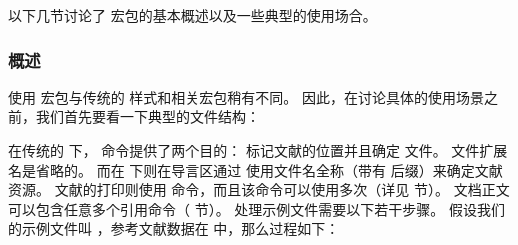 以下几节讨论了 \biblatex 宏包的基本概述以及一些典型的使用场合。

\subsubsection{概述}%
\label{use:use:int}


使用 \biblatex 宏包与传统的 \BibTeX 样式和相关宏包稍有不同。
因此，在讨论具体的使用场景之前，我们首先要看一下典型的文件结构：

%
在传统的 \BibTeX 下， 命令提供了两个目的：
标记文献的位置并且确定  文件。
文件扩展名是省略的。
而在 \biblatex 下则在导言区通过  使用文件名全称（带有  后缀）来确定文献资源。
文献的打印则使用  命令，而且该命令可以使用多次（详见  节）。
文档正文可以包含任意多个引用命令（ 节）。
处理示例文件需要以下若干步骤。
假设我们的示例文件叫 ，参考文献数据在  中，那么过程如下：

